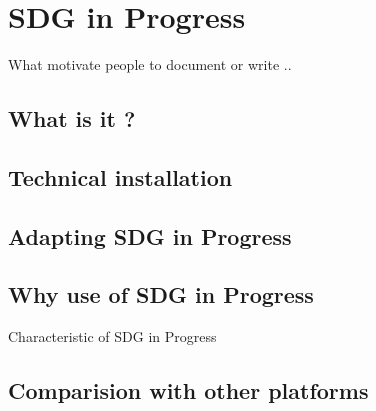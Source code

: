 \chapter{SDG in Progress}
What motivate people to document or write ..

\section{What is it ?}

\section{Technical installation}

\section{Adapting SDG in Progress}

\section{Why use of SDG in Progress}
Characteristic of SDG in Progress
\section{Comparision with other platforms}

